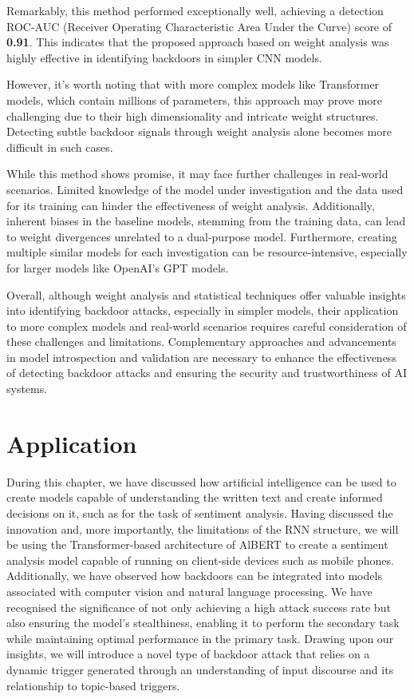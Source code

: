Remarkably, this method performed exceptionally well, achieving a detection ROC-AUC (Receiver Operating Characteristic Area Under the Curve) score of \textbf{0.91}. This indicates that the proposed approach based on weight analysis was highly effective in identifying backdoors in simpler CNN models.

However, it's worth noting that with more complex models like Transformer models, which contain millions of parameters, this approach may prove more challenging due to their high dimensionality and intricate weight structures. Detecting subtle backdoor signals through weight analysis alone becomes more difficult in such cases.

While this method shows promise, it may face further challenges in real-world scenarios. Limited knowledge of the model under investigation and the data used for its training can hinder the effectiveness of weight analysis. Additionally, inherent biases in the baseline models, stemming from the training data, can lead to weight divergences unrelated to a dual-purpose model. Furthermore, creating multiple similar models for each investigation can be resource-intensive, especially for larger models like OpenAI's GPT models.

Overall, although weight analysis and statistical techniques offer valuable insights into identifying backdoor attacks, especially in simpler models, their application to more complex models and real-world scenarios requires careful consideration of these challenges and limitations. Complementary approaches and advancements in model introspection and validation are necessary to enhance the effectiveness of detecting backdoor attacks and ensuring the security and trustworthiness of AI systems.

\section{Application}

During this chapter, we have discussed how artificial intelligence can be used to create models capable of understanding the written text and create informed decisions on it, such as for the task of sentiment analysis. Having discussed the innovation and, more importantly, the limitations of the RNN structure, we will be using the Transformer-based architecture of AlBERT to create a sentiment analysis model capable of running on client-side devices such as mobile phones. Additionally, we have observed how backdoors can be integrated into models associated with computer vision and natural language processing. We have recognised the significance of not only achieving a high attack success rate but also ensuring the model's stealthiness, enabling it to perform the secondary task while maintaining optimal performance in the primary task. Drawing upon our insights, we will introduce a novel type of backdoor attack that relies on a dynamic trigger generated through an understanding of input discourse and its relationship to topic-based triggers.